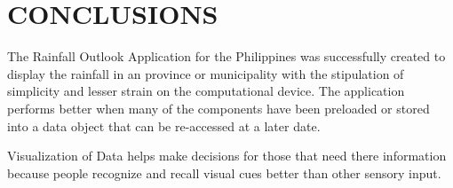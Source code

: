 \documentclass[letterpaper, 10 pt, conference]{ieeeconf}  %
\begin{document}
\section{CONCLUSIONS}

The Rainfall Outlook Application for the Philippines was successfully created to display the rainfall in an province or municipality with the stipulation of simplicity and lesser strain on the computational device. The application performs better when many of the components have been preloaded or stored into a data object that can be re-accessed at a later date. \setlength{\parskip}{6pt}

Visualization of Data helps make decisions for those that need there information because people recognize and recall visual cues better than other sensory input.

\addtolength{\textheight}{-12cm}   %






 

\end{document}
